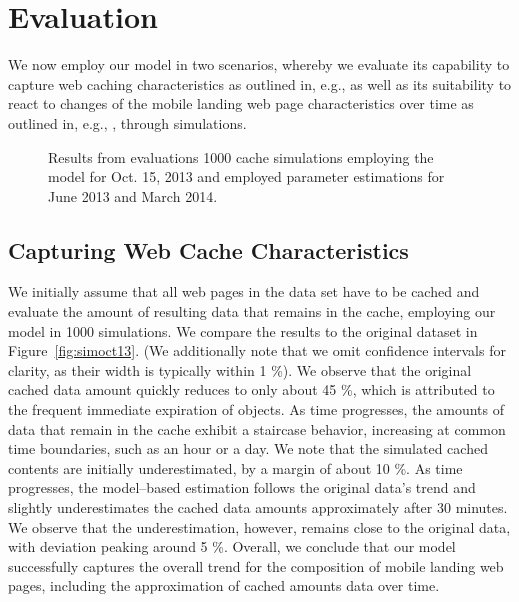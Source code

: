 \documentclass[letterpaper,conference]{IEEEtran}
\begin{document}
\section{Evaluation}
\label{s:eval}
We now employ our model in two scenarios, whereby we evaluate its capability to capture web caching characteristics as outlined in, e.g., \cite{JoSe14GreenComm} as well as its suitability to react to changes of the mobile landing web page characteristics over time as outlined in, e.g., \cite{JoSe14Commag}, through simulations.

\begin{figure*}[h]
	\centering
	\label{fig:simjun13}
%
	\label{fig:simoct13}
%
	\label{fig:simmar14}
%
	\caption{Results from evaluations 1000 cache simulations employing the model for Oct. 15, 2013 and employed parameter estimations for June 2013 and March 2014.\label{fig:simpages}}
\end{figure*}

\subsection{Capturing Web Cache Characteristics}
We initially assume that all web pages in the data set have to be cached and evaluate the amount of resulting data that remains in the cache, employing our model in 1000 simulations. 
We compare the results to the original dataset in Figure~\ref{fig:simoct13}.  
(We additionally note that we omit confidence intervals for clarity, as their width is typically within 1 \%).
We observe that the original cached data amount quickly reduces to only about 45 \%, which is attributed to the frequent immediate expiration of objects.
As time progresses, the amounts of data that remain in the cache exhibit a staircase behavior, increasing at common time boundaries, such as an hour or a day.
We note that the simulated cached contents are initially underestimated, by a margin of about 10 \%. 
As time progresses, the model--based estimation follows the original data's trend and slightly underestimates the cached data amounts approximately after 30 minutes.
We observe that the underestimation, however, remains close to the original data, with deviation peaking around 5 \%.
Overall, we conclude that our model successfully captures the overall trend for the composition of mobile landing web pages, including the approximation of cached amounts data over time. 
\end{document}

